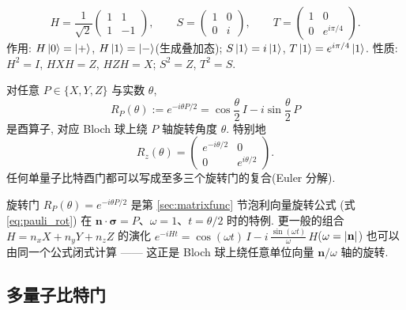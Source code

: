 \documentclass[utf8]{article} %
\numberwithin{equation}{section}   %
\newtheorem{Def}{\hskip 2em {\color{green} 定义}}[subsection]
\newtheorem{Thm}{\hskip 2em {\color{blue} 定理}}[subsection]
\newtheorem{Note}{\hskip 2em {\color{red} 注}}[subsection]
\begin{document}
\begin{Def}
    \begin{equation}
        H = \frac{1}{\sqrt{2}} \begin{pmatrix} 1 & 1 \\ 1 & -1 \end{pmatrix}, \qquad
        S = \begin{pmatrix} 1 & 0 \\ 0 & i \end{pmatrix}, \qquad
        T = \begin{pmatrix} 1 & 0 \\ 0 & e^{i\pi/4} \end{pmatrix}.
    \end{equation}
    作用: $H\ket{0} = \ket{+}$, $H\ket{1} = \ket{-}$(生成叠加态);
    $S\ket{1} = i\ket{1}$, $T\ket{1} = e^{i\pi/4}\ket{1}$.
    性质: $H^2 = I$, $HXH = Z$, $HZH = X$; $S^2 = Z$, $T^2 = S$.
\end{Def}

\begin{Thm}
    对任意 $P \in \{X, Y, Z\}$ 与实数 $\theta$,
    \begin{equation}
        R_P(\theta) := e^{-i\theta P/2} = \cos\frac{\theta}{2}\, I - i\sin\frac{\theta}{2}\, P
    \end{equation}
    是酉算子, 对应 Bloch 球上绕 $P$ 轴旋转角度 $\theta$. 特别地
    \begin{equation}
        R_z(\theta) = \begin{pmatrix} e^{-i\theta/2} & 0 \\ 0 & e^{i\theta/2} \end{pmatrix}.
    \end{equation}
    任何单量子比特酉门都可以写成至多三个旋转门的复合(Euler 分解).
\end{Thm}

\begin{Note}[与泡利向量旋转公式的联系]
    旋转门 $R_P(\theta) = e^{-i\theta P/2}$ 是第 \ref{sec:matrixfunc} 节泡利向量旋转公式
    (式 \eqref{eq:pauli_rot}) 在 $\mathbf{n}\cdot\boldsymbol{\sigma} = P$、$\omega = 1$、$t = \theta/2$
    时的特例. 更一般的组合 $H = n_x X + n_y Y + n_z Z$ 的演化
    $e^{-iHt} = \cos(\omega t)\,I - i\,\frac{\sin(\omega t)}{\omega}\,H$($\omega = \abs{\mathbf{n}}$)
    也可以由同一个公式闭式计算 —— 这正是 Bloch 球上绕任意单位向量 $\mathbf{n}/\omega$ 轴的旋转.
\end{Note}

\subsection{多量子比特门}
\end{document}
